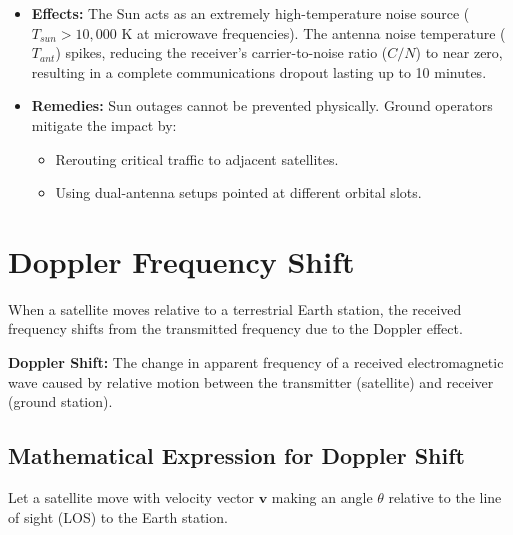 \documentclass[12pt,a4paper]{article}
\begin{document}
\begin{itemize}[leftmargin=*, itemsep=4pt]
  \item \textbf{Effects:} The Sun acts as an extremely high-temperature noise source ($T_{sun} > 10,000 \text{ K}$ at microwave frequencies). The antenna noise temperature ($T_{ant}$) spikes, reducing the receiver's carrier-to-noise ratio ($C/N$) to near zero, resulting in a complete communications dropout lasting up to 10 minutes.
  \item \textbf{Remedies:} Sun outages cannot be prevented physically. Ground operators mitigate the impact by:
    \begin{itemize}[leftmargin=*, itemsep=2pt, topsep=2pt]
      \item Rerouting critical traffic to adjacent satellites.
      \item Using dual-antenna setups pointed at different orbital slots.
    \end{itemize}
\end{itemize}

\section{Doppler Frequency Shift}

When a satellite moves relative to a terrestrial Earth station, the received frequency shifts from the transmitted frequency due to the Doppler effect.

\begin{tcolorbox}[defbox]
\textbf{Doppler Shift:} The change in apparent frequency of a received electromagnetic wave caused by relative motion between the transmitter (satellite) and receiver (ground station).
\end{tcolorbox}

\subsection{Mathematical Expression for Doppler Shift}
Let a satellite move with velocity vector $\mathbf{v}$ making an angle $\theta$ relative to the line of sight (LOS) to the Earth station.
\end{document}
